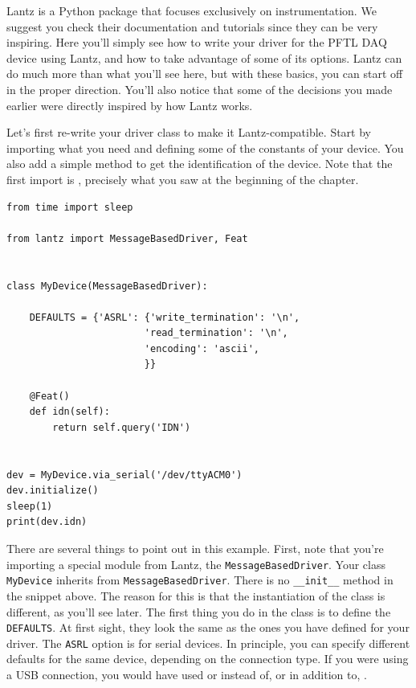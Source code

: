 Lantz is a Python package that focuses exclusively on instrumentation. We suggest you check their documentation and tutorials since they can be very inspiring. Here you'll simply see how to write your driver for the {PFTL DAQ} device using Lantz, and how to take advantage of some of its options. Lantz can do much more than what you'll see here, but with these basics, you can start off in the proper direction. You'll also notice that some of the decisions you made earlier were directly inspired by how Lantz works.

Let's first re-write your driver class to make it Lantz-compatible. Start by importing what you need and defining some of the constants of your device. You also add a simple method to get the identification of the device. Note that the first import is , precisely what you saw at the beginning of the chapter.

\begin{verbatim}
from time import sleep

from lantz import MessageBasedDriver, Feat


class MyDevice(MessageBasedDriver):

    DEFAULTS = {'ASRL': {'write_termination': '\n',
                        'read_termination': '\n',
                        'encoding': 'ascii',
                        }}

    @Feat()
    def idn(self):
        return self.query('IDN')


dev = MyDevice.via_serial('/dev/ttyACM0')
dev.initialize()
sleep(1)
print(dev.idn)
\end{verbatim}

There are several things to point out in this example. First, note that you're importing a special module from Lantz, the \texttt{MessageBasedDriver}. Your class \texttt{MyDevice} inherits from \texttt{MessageBasedDriver}. There is no \texttt{__init__} method in the snippet above. The reason for this is that the instantiation of the class is different, as you'll see later. The first thing you do in the class is to define the \texttt{DEFAULTS}. At first sight, they look the same as the ones you have defined for your driver. The \texttt{ASRL} option is for serial devices. In principle, you can specify different defaults for the same device, depending on the connection type. If you were using a {USB} connection, you would have used  or  instead of, or in addition to, .

